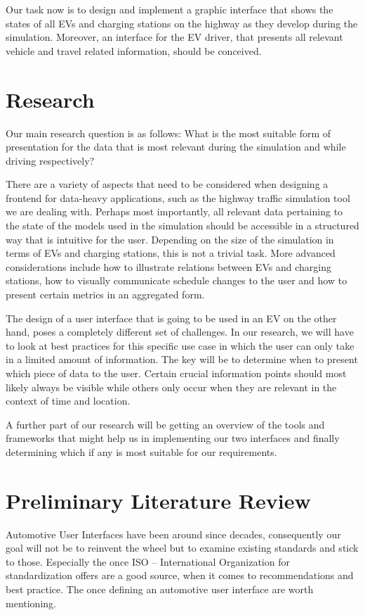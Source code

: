 \documentclass[hidelinks]{sig-alternate}
\begin{document}
Our task now is to design and implement a graphic interface that shows the states of all EVs and charging stations on
the highway as they develop during the simulation. Moreover, an interface for the EV driver, that presents all
relevant vehicle and travel related information, should be conceived.


\section{Research}

Our main research question is as follows: What is the most suitable form of presentation for the data that is most
relevant during the simulation and while driving respectively?

There are a variety of aspects that need to be considered when designing a frontend for data-heavy applications,
such as the highway traffic simulation tool we are dealing with. Perhaps most importantly, all relevant data
pertaining to the state of the models used in the simulation should be accessible in a structured way that is intuitive
for the user. Depending on the size of the simulation in terms of EVs and charging stations, this is not a trivial
task. More advanced considerations include how to illustrate relations between EVs and charging stations, how to
visually communicate schedule changes to the user and how to present certain metrics in an aggregated form.

The design of a user interface that is going to be used in an EV on the other hand, poses a completely different set
of challenges. In our research, we will have to look at best practices for this specific use case in which the user
can only take in a limited amount of information. The key will be to determine when to present which piece of
data to the user. Certain crucial information points should most likely always be visible while others only occur
when they are relevant in the context of time and location.

A further part of our research will be getting an overview of the tools and frameworks that might help us in
implementing our two interfaces and finally determining which if any is most suitable for our requirements.


\section{Preliminary Literature Review}

Automotive User Interfaces have been around since decades, consequently our goal will not be to reinvent the wheel
but to examine existing standards and stick to those. Especially the once ISO – International Organization for
standardization offers are a good source, when it comes to recommendations and best practice. The once defining an
automotive user interface are worth mentioning\cite{4}.
\end{document}
